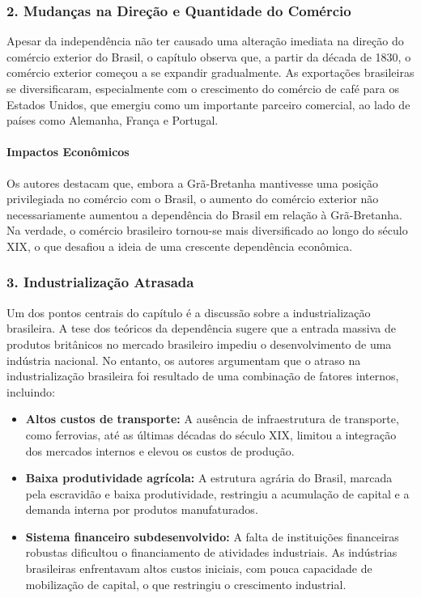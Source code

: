 \documentclass[a4paper,12pt]{article}[abntex2]
\begin{document}
\subsubsection*{2. Mudanças na Direção e Quantidade do Comércio}
Apesar da independência não ter causado uma alteração imediata na direção do comércio exterior do Brasil, o capítulo observa que, a partir da década de 1830, o comércio exterior começou a se expandir gradualmente. As exportações brasileiras se diversificaram, especialmente com o crescimento do comércio de café para os Estados Unidos, que emergiu como um importante parceiro comercial, ao lado de países como Alemanha, França e Portugal.

\paragraph*{Impactos Econômicos}
Os autores destacam que, embora a Grã-Bretanha mantivesse uma posição privilegiada no comércio com o Brasil, o aumento do comércio exterior não necessariamente aumentou a dependência do Brasil em relação à Grã-Bretanha. Na verdade, o comércio brasileiro tornou-se mais diversificado ao longo do século XIX, o que desafiou a ideia de uma crescente dependência econômica.

\subsubsection*{3. Industrialização Atrasada}
Um dos pontos centrais do capítulo é a discussão sobre a industrialização brasileira. A tese dos teóricos da dependência sugere que a entrada massiva de produtos britânicos no mercado brasileiro impediu o desenvolvimento de uma indústria nacional. No entanto, os autores argumentam que o atraso na industrialização brasileira foi resultado de uma combinação de fatores internos, incluindo:

\begin{itemize}
    \item \textbf{Altos custos de transporte:} A ausência de infraestrutura de transporte, como ferrovias, até as últimas décadas do século XIX, limitou a integração dos mercados internos e elevou os custos de produção.
    \item \textbf{Baixa produtividade agrícola:} A estrutura agrária do Brasil, marcada pela escravidão e baixa produtividade, restringiu a acumulação de capital e a demanda interna por produtos manufaturados.
    \item \textbf{Sistema financeiro subdesenvolvido:} A falta de instituições financeiras robustas dificultou o financiamento de atividades industriais. As indústrias brasileiras enfrentavam altos custos iniciais, com pouca capacidade de mobilização de capital, o que restringiu o crescimento industrial.
\end{itemize}
\end{document}
